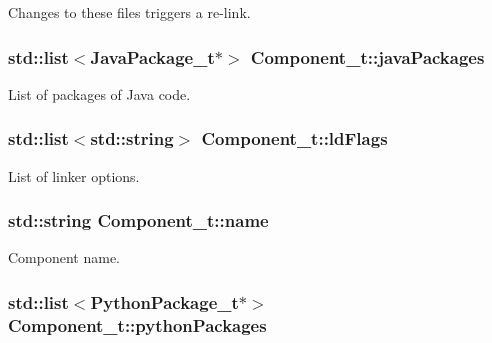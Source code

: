 Changes to these files triggers a re-\/link. 

\subsubsection[{\texorpdfstring{java\+Packages}{javaPackages}}]{\setlength{\rightskip}{0pt plus 5cm}std\+::list$<${\bf Java\+Package\+\_\+t}$\ast$$>$ Component\+\_\+t\+::java\+Packages}\hypertarget{struct_component__t_ac38c40670b28c61ebcf208d455fa9a8d}{}\label{struct_component__t_ac38c40670b28c61ebcf208d455fa9a8d}


List of packages of Java code. 

\subsubsection[{\texorpdfstring{ld\+Flags}{ldFlags}}]{\setlength{\rightskip}{0pt plus 5cm}std\+::list$<$std\+::string$>$ Component\+\_\+t\+::ld\+Flags}\hypertarget{struct_component__t_aff938a859dca5d5372cf9304b33823fd}{}\label{struct_component__t_aff938a859dca5d5372cf9304b33823fd}


List of linker options. 

\subsubsection[{\texorpdfstring{name}{name}}]{\setlength{\rightskip}{0pt plus 5cm}std\+::string Component\+\_\+t\+::name}\hypertarget{struct_component__t_ac82a73a6495bf5092a52be39bc529644}{}\label{struct_component__t_ac82a73a6495bf5092a52be39bc529644}


Component name. 

\subsubsection[{\texorpdfstring{python\+Packages}{pythonPackages}}]{\setlength{\rightskip}{0pt plus 5cm}std\+::list$<${\bf Python\+Package\+\_\+t}$\ast$$>$ Component\+\_\+t\+::python\+Packages}\hypertarget{struct_component__t_a18527ba203b726174899273ef4a458eb}{}\label{struct_component__t_a18527ba203b726174899273ef4a458eb}


